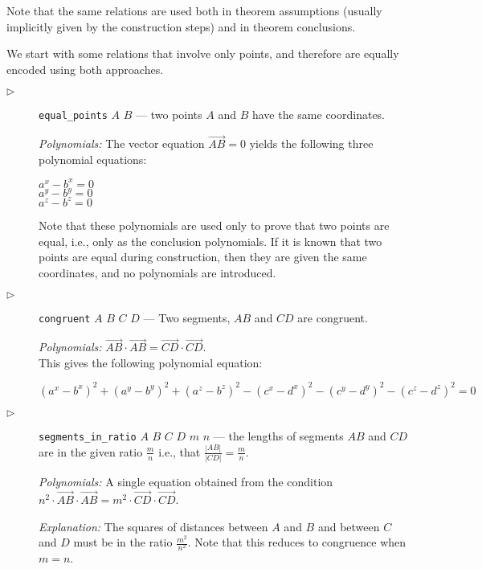 \documentclass[final,1p,times,authoryear]{elsarticle}
\begin{document}
Note that the same relations are used both in theorem assumptions
(usually implicitly given by the construction steps) and in theorem
conclusions.

We start with some relations that involve only points, and therefore
are equally encoded using both approaches.

\begin{description}
\item[$\triangleright$] {\tt equal\_points} $A$ $B$ --- two points $A$
  and $B$ have the same coordinates.

  {\em Polynomials:} The vector equation $\overrightarrow{AB} = 0$
  yields the following three polynomial equations:
  \begin{tabbing}
    $a^x - b^x = 0$\\
    $a^y - b^y = 0$\\
    $a^z - b^z = 0$
  \end{tabbing}

  Note that these polynomials are used only to prove that two points
  are equal, i.e., only as the conclusion polynomials. If it is known
  that two points are equal during construction, then they are given
  the same coordinates, and no polynomials are introduced.

\item[$\triangleright$] {\tt congruent} $A$ $B$ $C$ $D$ --- Two
  segments, $AB$ and $CD$ are congruent.


{\em Polynomials:}
$\overrightarrow{AB} \cdot \overrightarrow{AB} = \overrightarrow{CD} \cdot \overrightarrow{CD}$. \\
This gives the following polynomial equation:

$$({a^x} - {b^x})^2 + ({a^y} - {b^y})^2 + ({a^z} - {b^z})^2 - ({c^x} - {d^x})^2 - ({c^y} - {d^y})^2 - ({c^z} - {d^z})^2 = 0$$

\item[$\triangleright$] {\tt segments\_in\_ratio} $A$ $B$ $C$ $D$
  $m$ $n$ --- the lengths of segments $AB$ and
  $CD$ are in the given ratio $\frac{m}{n}$ i.e., that
  $\frac{|AB|}{|CD|} = \frac{m}{n}$.

{\em Polynomials:} A single equation obtained from the condition
$n^2 \cdot \overrightarrow{AB} \cdot \overrightarrow{AB} = m^2 \cdot \overrightarrow{CD} \cdot \overrightarrow{CD}$.

{\em Explanation:} The squares of distances between $A$ and $B$ and
between $C$ and $D$ must be in the ratio $\frac{m^2}{n^2}$. Note that
this reduces to congruence when $m = n$.


\end{description}
\end{document}
